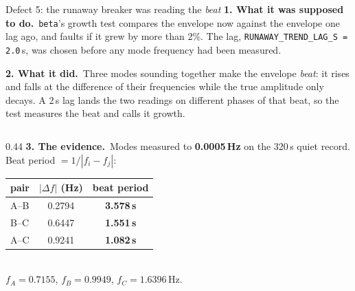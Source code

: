 \documentclass[aspectratio=169]{beamer}
\newcommand{\intended}{\textbf{1. What it was supposed to do.}}
\newcommand{\actual}{\textbf{2. What it did.}}
\newcommand{\evidence}{\textbf{3. The evidence.}}
\begin{document}
\begin{frame}{Defect 5: the runaway breaker was reading the \emph{beat}}
  \footnotesize
  \intended\ \texttt{beta}'s growth test compares the envelope now against the
  envelope one lag ago, and faults if it grew by more than 2\%. The lag,
  \texttt{RUNAWAY\_TREND\_LAG\_S = 2.0}\,s, was chosen before any mode frequency
  had been measured.

  \vspace{1mm}
  \actual\ Three modes sounding together make the envelope \emph{beat}: it rises
  and falls at the difference of their frequencies while the true amplitude only
  decays. A 2\,s lag lands the two readings on different phases of that beat, so
  the test measures the beat and calls it growth.

  \vspace{1mm}
  \begin{columns}[T]
    \begin{column}{0.44\textwidth}
      \evidence\ Modes measured to \textbf{0.0005\,Hz} on the 320\,s quiet
      record. Beat period $= 1/|f_i - f_j|$:

      \vspace{1mm}
      \centering
      {\scriptsize
      \begin{tabular}{@{}lcc@{}}
        \toprule
        pair & $|\Delta f|$ (Hz) & beat period \\
        \midrule
        A--B & 0.2794 & \textbf{3.578\,s} \\
        B--C & 0.6447 & \textbf{1.551\,s} \\
        A--C & 0.9241 & \textbf{1.082\,s} \\
        \bottomrule
      \end{tabular}}\\[1mm]
      {\scriptsize $f_A = 0.7155$, $f_B = 0.9949$, $f_C = 1.6396$\,Hz.}


\end{column}
\end{columns}
\end{frame}
\end{document}
